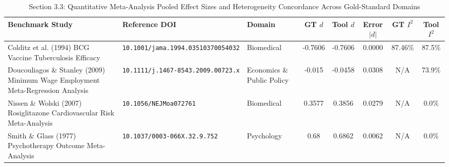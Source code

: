 \begin{table}[t]
\centering
\small
\caption{Section 3.3: Quantitative Meta-Analysis Pooled Effect Sizes and Heterogeneity Concordance Across Gold-Standard Domains}
\label{tab:validation_meta_analysis}
\begin{tabular}{p{4.8cm}p{3.2cm}p{2.2cm}ccccc}
\hline
\textbf{Benchmark Study} & \textbf{Reference DOI} & \textbf{Domain} & \textbf{GT $d$} & \textbf{Tool $d$} & \textbf{Error $|d|$} & \textbf{GT $I^2$} & \textbf{Tool $I^2$} \\
\hline
Colditz et al. (1994) BCG Vaccine Tuberculosis Efficacy & \texttt{10.1001/jama.1994.03510370054032} & Biomedical & -0.7606 & -0.7606 & 0.0000 & 87.46\% & 87.5\% \\
Doucouliagos \& Stanley (2009) Minimum Wage Employment Meta-Regression Analysis & \texttt{10.1111/j.1467-8543.2009.00723.x} & Economics \& Public Policy & -0.015 & -0.0458 & 0.0308 & N/A & 73.9\% \\
Nissen \& Wolski (2007) Rosiglitazone Cardiovascular Risk Meta-Analysis & \texttt{10.1056/NEJMoa072761} & Biomedical & 0.3577 & 0.3856 & 0.0279 & N/A & 0.0\% \\
Smith \& Glass (1977) Psychotherapy Outcome Meta-Analysis & \texttt{10.1037/0003-066X.32.9.752} & Psychology & 0.68 & 0.6862 & 0.0062 & N/A & 0.0\% \\
\hline
\end{tabular}
\end{table}
